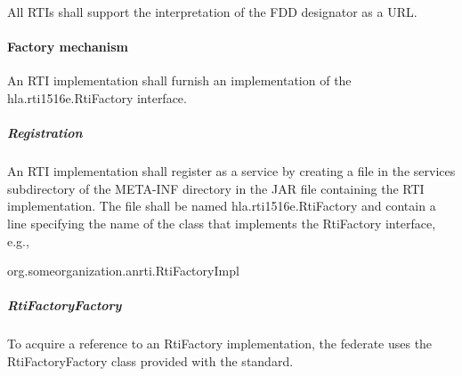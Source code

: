 \begin{compactstdpage}
    All RTIs shall support the interpretation of the FDD designator as a URL.

    \paragraph{Factory mechanism}

    An RTI implementation shall furnish an implementation of the hla.rti1516e.RtiFactory interface.

    \subparagraph{Registration}

    An RTI implementation shall register as a service by creating a file in the services subdirectory of the META-INF directory in the JAR file containing the RTI implementation. The file shall be named hla.rti1516e.RtiFactory and contain a line specifying the name of the class that implements the RtiFactory interface, e.g.,

            {\ttfamily\fontsize{8.7}{10}\selectfont org.someorganization.anrti.RtiFactoryImpl}

    \subparagraph{RtiFactoryFactory}

    To acquire a reference to an RtiFactory implementation, the federate uses the RtiFactoryFactory class provided with the standard.

\end{compactstdpage}

\clearpage

